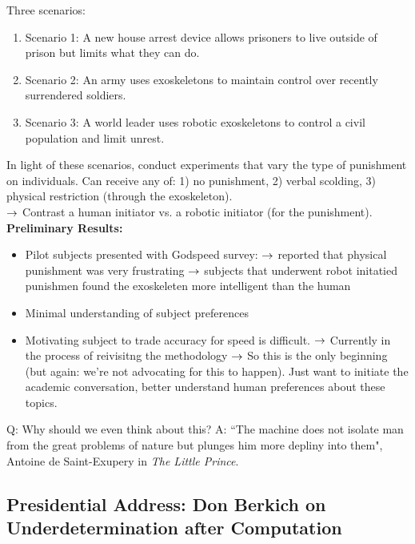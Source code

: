 Three scenarios:
\begin{enumerate}
	\item Scenario 1: A new house arrest device allows prisoners to live outside of prison but limits what they can do.
	\item Scenario 2: An army uses exoskeletons to maintain control over recently surrendered soldiers.
	\item Scenario 3: A world leader uses robotic exoskeletons to control a civil population and limit unrest.
\end{enumerate}

In light of these scenarios, conduct experiments that vary the type of punishment on individuals. Can receive any of: 1) no punishment, 2) verbal scolding, 3) physical restriction (through the exoskeleton). \\

$\rightarrow$ Contrast a human initiator vs. a robotic initiator (for the punishment). \\

{\bf Preliminary Results:}
\begin{itemize}
	\item Pilot subjects presented with Godspeed survey:
	$\rightarrow$ reported that physical punishment was very frustrating
	$\rightarrow$ subjects that underwent robot initatied punishmen found the exoskeleten more intelligent than the human
	\item Minimal understanding of subject preferences
	\item Motivating subject to trade accuracy for speed is difficult.
	$\rightarrow$ Currently in the process of reivisitng the methodology
	$\rightarrow$ So this is the only beginning (but again: we're not advocating for this to happen). Just want to initiate the academic conversation, better understand human preferences about these topics.
\end{itemize}

Q: Why should we even think about this?
A: ``The machine does not isolate man from the great problems of nature but plunges him more depliny into them", Antoine de Saint-Exupery in {\it The Little Prince}. \\



\spacerule{}

\subsection{Presidential Address: Don Berkich on Underdetermination after Computation}


